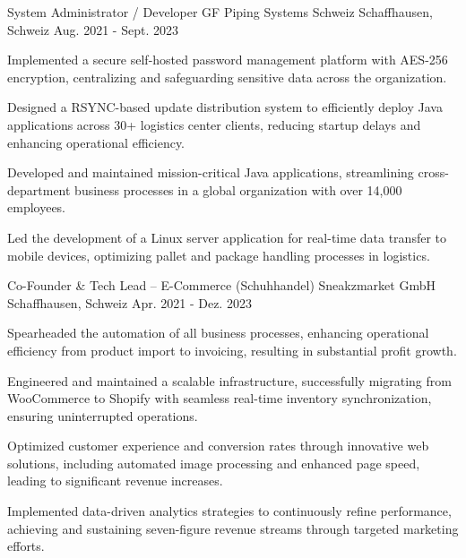 \begin{cventries}
\cventry
  {System Administrator / Developer}
  {GF Piping Systems Schweiz}
  {Schaffhausen, Schweiz}
  {Aug. 2021 - Sept. 2023}
  {
    \begin{cvitems}
\item {Implemented a secure self-hosted password management platform with AES-256 encryption, centralizing and safeguarding sensitive data across the organization.}
\item {Designed a RSYNC-based update distribution system to efficiently deploy Java applications across 30+ logistics center clients, reducing startup delays and enhancing operational efficiency.}
\item {Developed and maintained mission-critical Java applications, streamlining cross-department business processes in a global organization with over 14,000 employees.}
\item {Led the development of a Linux server application for real-time data transfer to mobile devices, optimizing pallet and package handling processes in logistics.}
\end{cvitems}
  }

\cventry
  {Co-Founder \& Tech Lead – E-Commerce (Schuhhandel)}
  {Sneakzmarket GmbH}
  {Schaffhausen, Schweiz}
  {Apr. 2021 - Dez. 2023}
  {
    \begin{cvitems}
\item {Spearheaded the automation of all business processes, enhancing operational efficiency from product import to invoicing, resulting in substantial profit growth.}
\item {Engineered and maintained a scalable infrastructure, successfully migrating from WooCommerce to Shopify with seamless real-time inventory synchronization, ensuring uninterrupted operations.}
\item {Optimized customer experience and conversion rates through innovative web solutions, including automated image processing and enhanced page speed, leading to significant revenue increases.}
\item {Implemented data-driven analytics strategies to continuously refine performance, achieving and sustaining seven-figure revenue streams through targeted marketing efforts.}
\end{cvitems}
  }


\end{cventries}
